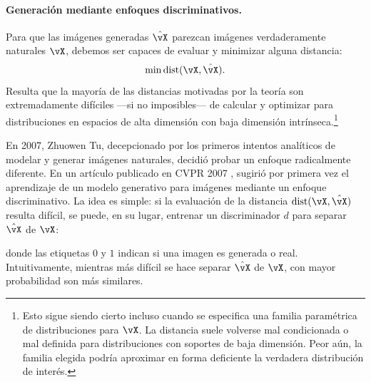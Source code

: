 \documentclass[../../book-main_es.tex]{subfiles}
\begin{document}
\paragraph{Generación mediante enfoques discriminativos.}
Para que las imágenes generadas \(\hat{\vX}\) parezcan imágenes verdaderamente naturales
\(\vX\), debemos ser capaces de evaluar y minimizar alguna distancia:
\begin{equation}
    \min \operatorname{dist}(\vX, \hat{\vX}).
\end{equation}
Resulta que la mayoría de las distancias motivadas por la teoría son extremadamente
difíciles ---si no imposibles--- de calcular y optimizar para
distribuciones en espacios de alta dimensión con baja
dimensión intrínseca.\footnote{Esto sigue siendo cierto incluso cuando se 
    especifica una familia paramétrica de distribuciones para \(\vX\). 
    La distancia suele volverse mal condicionada o mal definida para 
    distribuciones con soportes de baja dimensión.  Peor aún, la familia 
    elegida podría aproximar en forma deficiente la verdadera 
distribución de interés.}

En 2007, Zhuowen Tu, decepcionado por los primeros intentos analíticos de
modelar y generar imágenes naturales, decidió probar un enfoque
radicalmente diferente. En un artículo publicado en CVPR 2007 \cite{Tu-2007},
sugirió por primera vez el aprendizaje de un modelo generativo para imágenes mediante un
enfoque discriminativo. La idea es simple: si la evaluación de la
distancia \(\operatorname{dist}(\vX, \hat{\vX})\) resulta difícil,
se puede, en su lugar, entrenar un discriminador \(d\) para
separar \(\hat{\vX}\) de \(\vX\): 

\begin{figure}[h!]
    \centering
    \label{fig:gan-networks}
\end{figure}

donde las etiquetas \(0\) y \(1\) indican si una imagen es generada o real.
Intuitivamente, mientras más difícil se hace separar \(\hat{\vX}\) de 
\(\vX\), con mayor probabilidad son más similares.
\end{document}
